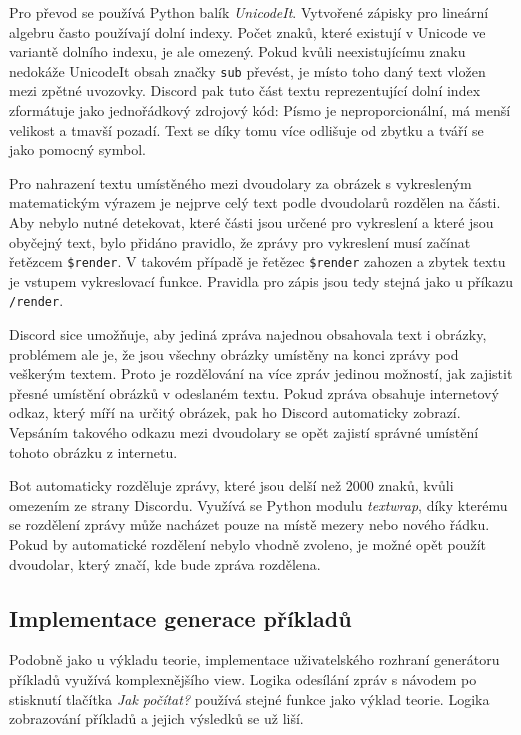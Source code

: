 \documentclass[FM]{tulthesis}
\begin{document}
	Pro převod se používá Python balík \textit{UnicodeIt}. Vytvořené zápisky pro lineární algebru často používají dolní indexy. Počet znaků, které existují v Unicode ve variantě dolního indexu, je ale omezený. Pokud kvůli neexistujícímu znaku nedokáže UnicodeIt obsah značky \verb|sub| převést, je místo toho daný text vložen mezi zpětné uvozovky. Discord pak tuto část textu reprezentující dolní index zformátuje jako jednořádkový zdrojový kód: Písmo je neproporcionální, má menší velikost a tmavší pozadí. Text se díky tomu více odlišuje od zbytku a tváří se jako pomocný symbol.
	
	Pro nahrazení textu umístěného mezi dvoudolary za obrázek s vykresleným matematickým výrazem je nejprve celý text podle dvoudolarů rozdělen na části. Aby nebylo nutné detekovat, které části jsou určené pro vykreslení a které jsou obyčejný text, bylo přidáno pravidlo, že zprávy pro vykreslení musí začínat řetězcem \verb|$render|. V takovém případě je řetězec \verb|$render| zahozen a zbytek textu je vstupem vykreslovací funkce. Pravidla pro zápis jsou tedy stejná jako u příkazu \verb|/render|.
	
	Discord sice umožňuje, aby jediná zpráva najednou obsahovala text i obrázky, problémem ale je, že jsou všechny obrázky umístěny na konci zprávy pod veškerým textem. Proto je rozdělování na více zpráv jedinou možností, jak zajistit přesné umístění obrázků v odeslaném textu. Pokud zpráva obsahuje internetový odkaz, který míří na určitý obrázek, pak ho Discord automaticky zobrazí. Vepsáním takového odkazu mezi dvoudolary se opět zajistí správné umístění tohoto obrázku z internetu.
	
	Bot automaticky rozděluje zprávy, které jsou delší než 2000 znaků, kvůli omezením ze strany Discordu. Využívá se Python modulu \textit{textwrap}, díky kterému se rozdělení zprávy může nacházet pouze na místě mezery nebo nového řádku. Pokud by automatické rozdělení nebylo vhodně zvoleno, je možné opět použít dvoudolar, který značí, kde bude zpráva rozdělena.
	
	\subsection{Implementace generace příkladů}
	
	Podobně jako u výkladu teorie, implementace uživatelského rozhraní generátoru příkladů využívá komplexnějšího view. Logika odesílání zpráv s návodem po stisknutí tlačítka \textit{Jak počítat?} používá stejné funkce jako výklad teorie. Logika zobrazování příkladů a jejich výsledků se už liší.
	
\end{document}
